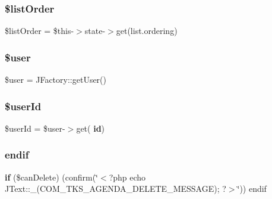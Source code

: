 \subsubsection{\$list\+Order}
{\footnotesize\ttfamily \$list\+Order = \$this-\/$>$state-\/$>$get(\textquotesingle{}list.\+ordering\textquotesingle{})}

\mbox{\label{default_8old_8php_a598ca4e71b15a1313ec95f0df1027ca5}} 
\subsubsection{\$user}
{\footnotesize\ttfamily \$user = J\+Factory\+::get\+User()}

\mbox{\label{default_8old_8php_a84651f4070d04080f6c5fd3c98cc9104}} 
\subsubsection{\$user\+Id}
{\footnotesize\ttfamily \$user\+Id = \$user-\/$>$get(\textquotesingle{}\textbf{ id}\textquotesingle{})}

\mbox{\label{default_8old_8php_a0c20e39df38d442ca420bfb908cabed6}} 
\subsubsection{endif}
{\footnotesize\ttfamily \textbf{ if} (\$can\+Delete) (confirm(\char`\"{}$<$?php echo J\+Text\+::\+\_\+(\textquotesingle{}C\+O\+M\+\_\+\+T\+K\+S\+\_\+\+A\+G\+E\+N\+D\+A\+\_\+\+D\+E\+L\+E\+T\+E\+\_\+\+M\+E\+S\+S\+A\+GE\textquotesingle{}); ?$>$\char`\"{})) endif}

